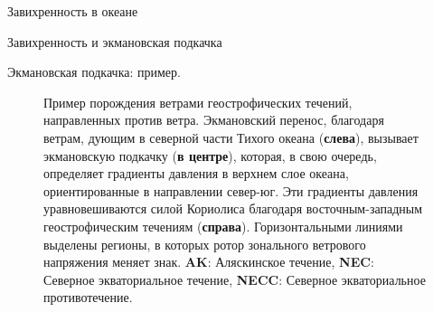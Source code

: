\begin{chapter}{Завихренность в океане}
\begin{section}{Завихренность и экмановская подкачка}
\begin{paragraph}{Экмановская подкачка: пример.}
\begin{figure}[b!]
\vspace{-3ex}
\caption{Пример порождения ветрами геострофических течений, направленных
против ветра. Экмановский перенос, благодаря
ветрам, дующим в северной части Тихого океана (\textbf{слева}), 
вызывает экмановскую подкачку (\textbf{в центре}), 
которая, в свою очередь, определяет градиенты давления в верхнем слое океана,
ориентированные в направлении север-юг. Эти градиенты давления уравновешиваются 
силой Кориолиса благодаря восточным-западным 
геострофическим течениям 
(\textbf{справа}). 
Горизонтальными линиями выделены регионы, в которых ротор зонального 
ветрового напряжения меняет знак. 
\textbf{AK}: Аляскинское течение, 
\textbf{NEC}: Северное экваториальное течение, 
\textbf{NECC}: Северное экваториальное противотечение.}
\label{fig:zonalmeanwinds}
\end{figure}
%

\end{paragraph}
\end{section}
\end{chapter}
